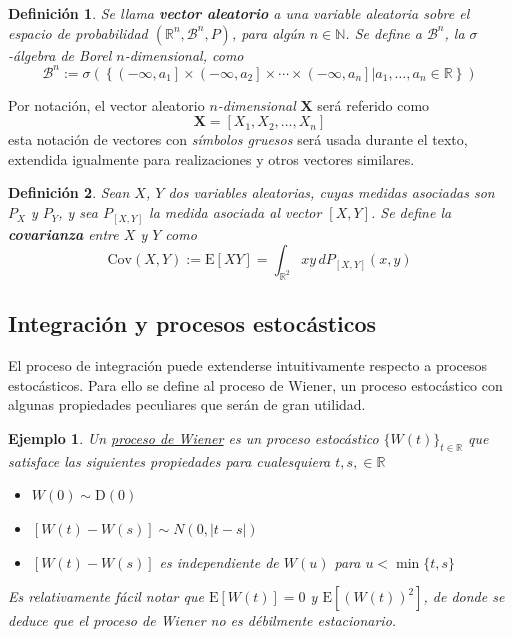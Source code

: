 \documentclass[12pt,letterpaper]{book}
\newtheorem{definicion}{Definición}[chapter]
\newtheorem{ejemplo}{Ejemplo}[chapter]
\newcommand{\R}{\mathbb{R}}
\newcommand{\N}{\mathbb{N}}
\newcommand{\E}[1]{\mathrm{E}\left[ #1 \right]}
\newcommand{\Cov}[1]{\mathrm{Cov}\left( #1 \right)}
\newcommand{\abso}[1]{\left| #1 \right|}
\begin{document}
\begin{definicion}
Se llama \textbf{vector aleatorio} a una variable aleatoria sobre el espacio de probabilidad $(\R^{n},\mathcal{B}^{n},P)$, para algún $n\in \N$. Se define a $\mathcal{B}^{n}$, la $\sigma$-álgebra de Borel $n$-dimensional, como
\begin{equation}
\mathcal{B}^{n} := \sigma\left(\left\{ \left(-\infty, a_1\right]\times \left(-\infty, a_2\right]\times \cdots \times \left(-\infty, a_n\right] \lvert a_1, \dots, a_n \in \R \right\}\right)
\end{equation}
\end{definicion}

Por notación, el vector aleatorio \textit{$n$-dimensional} $\boldsymbol{X}$ será referido como
\begin{equation}
\boldsymbol{X} = [X_1, X_2, \dots, X_n]
\end{equation}
esta notación de vectores con \textit{símbolos gruesos} será usada durante el texto, extendida igualmente para realizaciones y otros vectores similares.

\begin{definicion}
Sean $X$, $Y$ dos variables aleatorias, cuyas medidas asociadas son $P_X$ y $P_Y$, y sea $P_{[X,Y]}$ la medida asociada al vector $[X,Y]$. Se define la \textbf{covarianza} entre $X$ y $Y$ como
\begin{equation}
\Cov{X,Y} := \E{X Y} = \int_{\R^{2}} x y\, d P_{[X,Y]}(x,y)
\end{equation}
\end{definicion}

\subsection{Integración y procesos estocásticos}
\label{sec:int_proc_est}

El proceso de integración puede extenderse intuitivamente respecto a procesos estocásticos.
%
%
Para ello se define al proceso de Wiener, un proceso estocástico con algunas propiedades peculiares que serán de gran utilidad.

\begin{ejemplo}
Un \underline{proceso de Wiener} es un proceso estocástico $\{ W(t)\}_{t\in\R}$ que satisface las siguientes propiedades para cualesquiera $t, s, \in \R$
\begin{itemize}
\item $W(0) \sim \text{D}(0)$
\item $\left[W(t)-W(s)\right] \sim N(0, \abso{t-s})$
\item $\left[W(t)-W(s)\right]$ es independiente de $W(u)$ para $u < \min\{ t, s \}$
\end{itemize}

Es relativamente fácil notar que $\E{W(t)} = 0$ y $\E{\left(W(t)\right)^2}$, de donde se deduce que el proceso de Wiener no es débilmente estacionario.
\end{ejemplo}
\end{document}
